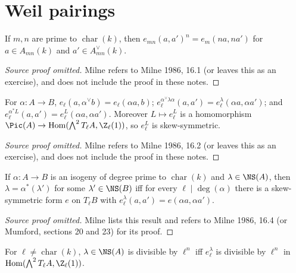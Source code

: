 \section{Weil pairings}
\begin{lemma}\label{lem:milne-weil-pairing-compatibility}
If $m,n$ are prime to $\operatorname{char}(k)$, then $e_{mn}(a,a')^n=e_m(na,na')$ for $a\in A_{mn}(k)$ and $a'\in A^\vee_{mn}(k)$.
\end{lemma}

\begin{proof}[Source proof omitted]
Milne refers to Milne 1986, 16.1 (or leaves this as an exercise), and does not
include the proof in these notes.
\end{proof}
\begin{proposition}\label{prop:milne-weil-pairing-functoriality}
For $\alpha:A\to B$, $e_\ell(a,\alpha^\vee b)=e_\ell(\alpha a,b)$; $e_\ell^{\alpha^\vee\lambda\alpha}(a,a')=e_\ell^\lambda(\alpha a,\alpha a')$; and $e_\ell^{\alpha^*L}(a,a')=e_\ell^L(\alpha a,\alpha a')$. Moreover $L\mapsto e_\ell^L$ is a homomorphism $\Pic(A)\to\operatorname{Hom}(\bigwedge^2T_\ell A,\Z_\ell(1))$, so $e_\ell^L$ is skew-symmetric.
\end{proposition}

\begin{proof}[Source proof omitted]
Milne refers to Milne 1986, 16.2 (or leaves this as an exercise), and does not
include the proof in these notes.
\end{proof}
\begin{theorem}\label{thm:milne-weil-pairing-descent}
If $\alpha:A\to B$ is an isogeny of degree prime to $\operatorname{char}(k)$ and $\lambda\in\NS(A)$, then $\lambda=\alpha^*(\lambda')$ for some $\lambda'\in\NS(B)$ iff for every $\ell\mid\deg(\alpha)$ there is a skew-symmetric form $e$ on $T_\ell B$ with $e_\ell^\lambda(a,a')=e(\alpha a,\alpha a')$.
\end{theorem}

\begin{proof}[Source proof omitted]
Milne lists this result and refers to Milne 1986, 16.4 (or Mumford, sections
20 and 23) for its proof.
\end{proof}
\begin{corollary}\label{cor:milne-weil-pairing-divisibility}
For $\ell\ne\operatorname{char}(k)$, $\lambda\in\NS(A)$ is divisible by $\ell^n$ iff $e_\ell^\lambda$ is divisible by $\ell^n$ in $\operatorname{Hom}(\bigwedge^2T_\ell A,\Z_\ell(1))$.
\end{corollary}

